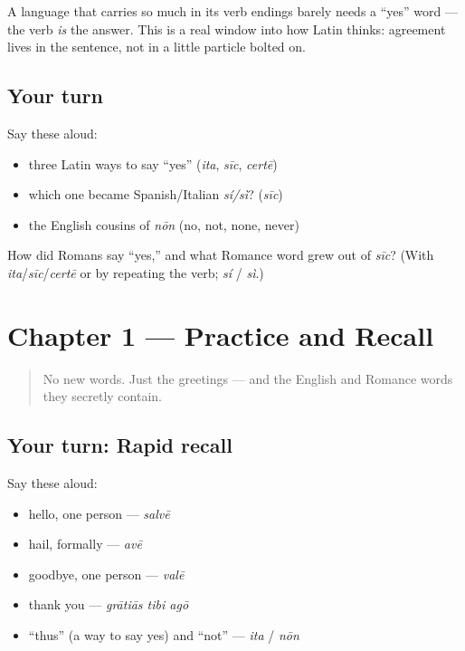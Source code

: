 \begin{culture}
A language that carries so much in its verb endings barely needs a \textquotedblleft{}yes\textquotedblright{} word — the verb \emph{is} the answer. This is a real window into how Latin thinks: agreement lives in the sentence, not in a little particle bolted on.
\end{culture}

\subsection*{Your turn}
Say these aloud:

\begin{itemize}
\raggedright
  \item three Latin ways to say \textquotedblleft{}yes\textquotedblright{} (\emph{ita}, \emph{sīc}, \emph{certē})
  \item which one became Spanish/Italian \emph{sí/sì}? (\emph{sīc})
  \item the English cousins of \emph{nōn} (no, not, none, never)
\end{itemize}

\begin{tcolorbox}[breakable,colback=teal!4,colframe=teal!35!black,title={Before you move on}]
How did Romans say \textquotedblleft{}yes,\textquotedblright{} and what Romance word grew out of \emph{sīc}? (With \emph{ita}/\emph{sīc}/\emph{certē} or by repeating the verb; \emph{sí} / \emph{sì}.)
\end{tcolorbox}
\section[Practice]{Chapter 1 — Practice and Recall}

\label{lesson:LA-C01-practice}



\begin{quote}
No new words. Just the greetings — and the English and Romance words they secretly contain.
\end{quote}

\subsection*{Your turn: Rapid recall}
Say these aloud:

\begin{itemize}
\raggedright
  \item hello, one person — \emph{salvē}
  \item hail, formally — \emph{avē}
  \item goodbye, one person — \emph{valē}
  \item thank you — \emph{grātiās tibi agō}
  \item \textquotedblleft{}thus\textquotedblright{} (a way to say yes) and \textquotedblleft{}not\textquotedblright{} — \emph{ita} / \emph{nōn}
\end{itemize}

